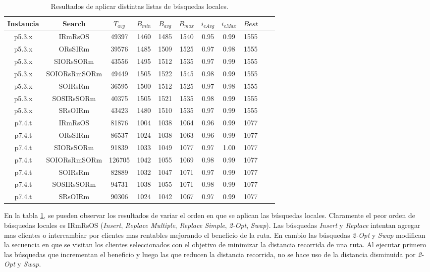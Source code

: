 \bigskip

\begin{table}
\begin{center}
\begin{tabular}{ |c|c|c|c|c|c|c|c|c|c|c| } 
\hline
Instancia & Search & $T_{avg}$ & $B_{min}$ & $B_{avg}$ & $B_{max}$ & $i_{eAvg}$ & $i_{eMax}$ & $Best$ \\
\hline
p5.3.x & IRmRsOS & 49397 & 1460 & 1485 & 1540 & 0.95 & 0.99 & 1555  \\
p5.3.x & ORsSIRm & 39576 & 1485 & 1509 & 1525 & 0.97 & 0.98 & 1555  \\
p5.3.x & SIORsSORm & 43556 & 1495 & 1512 & 1535 & 0.97 & 0.99 & 1555  \\
p5.3.x & SOIORsRmSORm & 49449 & 1505 & 1522 & 1545 & 0.98 & 0.99 & 1555  \\
p5.3.x & SOIRsRm & 36595 & 1500 & 1512 & 1525 & 0.97 & 0.98 & 1555  \\
p5.3.x & SOSIRsSORm & 40375 & 1505 & 1521 & 1535 & 0.98 & 0.99 & 1555  \\
p5.3.x & SRsOIRm & 43423 & 1480 & 1510 & 1535 & 0.97 & 0.99 & 1555  \\
p7.4.t & IRmRsOS & 81876 & 1004 & 1038 & 1064 & 0.96 & 0.99 & 1077  \\
p7.4.t & ORsSIRm & 86537 & 1024 & 1038 & 1063 & 0.96 & 0.99 & 1077  \\
p7.4.t & SIORsSORm & 91839 & 1033 & 1049 & 1077 & 0.97 & 1.00 & 1077  \\
p7.4.t & SOIORsRmSORm & 126705 & 1042 & 1055 & 1069 & 0.98 & 0.99 & 1077  \\
p7.4.t & SOIRsRm & 82889 & 1032 & 1047 & 1071 & 0.97 & 0.99 & 1077  \\
p7.4.t & SOSIRsSORm & 94731 & 1038 & 1055 & 1071 & 0.98 & 0.99 & 1077  \\
p7.4.t & SRsOIRm & 90306 & 1024 & 1042 & 1067 & 0.97 & 0.99 & 1077  \\
\hline
\end{tabular}
\end{center}
\caption{Resultados de aplicar distintas listas de búsquedas locales.}
\label{tab:resultadosListaLS}
\end{table}


En la tabla \ref{tab:resultadosListaLS}, se pueden observar los resultados de variar el orden en que se aplican las búsquedas locales. Claramente el peor orden de búsquedas locales es IRmRsOS (\textit{Insert}, \textit{Replace Multiple}, \textit{Replace Simple}, \textit{2-Opt}, \textit{Swap}). Las búsquedas \textit{Insert} y \textit{Replace} intentan agregar mas clientes o intercambiar por clientes mas rentables mejorando el beneficio de la ruta. En cambio las búsquedas \textit{2-Opt} y \textit{Swap} modifican la secuencia en que se visitan los clientes seleccionados con el objetivo de minimizar la distancia recorrida de una ruta. Al ejecutar primero las búsquedas que incrementan el beneficio y luego las que reducen la distancia recorrida, no se hace uso de la distancia disminuida por \textit{2-Opt} y \textit{Swap}.

